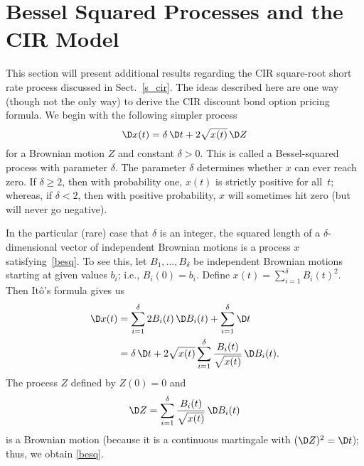 \section{Bessel Squared Processes and the CIR Model}\label{a_bessel}

This section will present additional results regarding the CIR square-root short rate process discussed in Sect.~\ref{s_cir}.  The ideas described here are one way (though not the only way) to derive the CIR discount bond option pricing formula.  We begin with the following simpler process
\begin{equation}\label{besq}
\D x(t) = \delta\,\D t + 2 \sqrt{x(t)}\,\D Z
\end{equation}
for a Brownian motion $Z$ and constant $\delta>0$.  This is called a Bessel-squared process with parameter $\delta$.    The parameter $\delta$ determines whether
$x$ can ever reach zero.  If $\delta \geq 2$, then with probability
one, $x(t)$ is strictly positive for all~$t$; whereas, if $\delta < 2$, then
with positive probability, $x$ will sometimes hit zero (but will
never go negative). 

In the particular (rare)
case that $\delta$ is an integer, the squared length of a
$\delta$-dimensional vector of independent Brownian motions is a
process $x$ satisfying~\eqref{besq}.  To see this, let $B_1, \ldots, B_\delta$ be independent Brownian motions starting at given values $b_i$; i.e., $B_i(0) = b_i$.  Define $x(t) = \sum_{i=1}^\delta B_i(t)^2$.  Then It\^o's formula gives us
\begin{align*}
\D x(t) &= \sum_{i=1}^\delta 2B_i(t)\,\D B_i(t) + \sum_{i=1}^\delta \D t\\
&= \delta\,\D t + 2 \sqrt{x(t)}\sum_{i=1}^\delta \frac{B_i(t)}{\sqrt{x(t)}}\,\D B_i(t).
\end{align*}
The process $Z$ defined by $Z(0)=0$ and
$$\D Z = \sum_{i=1}^\delta \frac{B_i(t)}{\sqrt{x(t)}}\,\D B_i(t)$$
is a Brownian motion (because it is a continuous martingale with $(\D Z)^2=\D t$); thus, we obtain  \eqref{besq}.  

